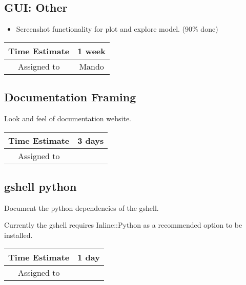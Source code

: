 \documentclass[12pt]{article}
\begin{document}
\subsection{GUI: Other}
\begin{itemize}
\item Screenshot functionality for plot and explore model. (90\% done)
\end{itemize}

\begin{center}
  \vspace{5mm}
  \centering
  \begin{tabular}{|c|c|}
    \hline
    Time Estimate
    & 1 week \\
    \hline
    Assigned to
    & Mando \\
    \hline
  \end{tabular}
\end{center}


\subsection{Documentation Framing}

Look and feel of documentation website.

\begin{center}
  \vspace{5mm}
  \centering
  \begin{tabular}{|c|c|}
    \hline
    Time Estimate
    & 3 days \\
    \hline
    Assigned to
    & \\
    \hline
  \end{tabular}
\end{center}



\subsection{gshell python}

Document the python dependencies of the gshell.

Currently the gshell requires Inline::Python as a recommended option
to be installed.

\begin{center}
  \vspace{5mm}
  \centering
  \begin{tabular}{|c|c|}
    \hline
    Time Estimate
    & 1 day \\
    \hline
    Assigned to
    & \\
    \hline
  \end{tabular}
\end{center}
\end{document}
